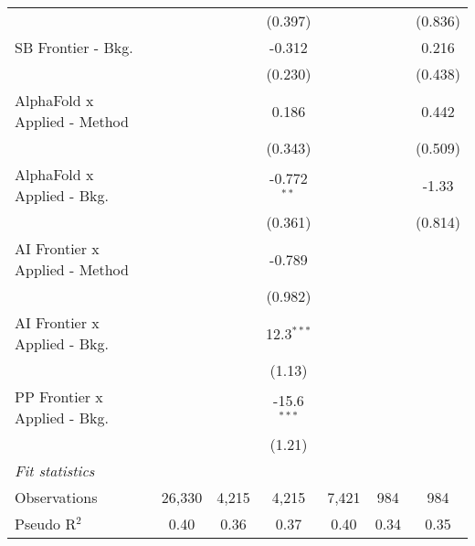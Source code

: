 \begin{tabular}{lcccccc}
                                  &               &               & (0.397)       &              &         & (0.836)\\   
   SB Frontier - Bkg.             &               &               & -0.312        &              &         & 0.216\\   
                                  &               &               & (0.230)       &              &         & (0.438)\\   
   AlphaFold x Applied - Method   &               &               & 0.186         &              &         & 0.442\\   
                                  &               &               & (0.343)       &              &         & (0.509)\\   
   AlphaFold x Applied - Bkg.     &               &               & -0.772$^{**}$ &              &         & -1.33\\   
                                  &               &               & (0.361)       &              &         & (0.814)\\   
   AI Frontier x Applied - Method &               &               & -0.789        &              &         &   \\   
                                  &               &               & (0.982)       &              &         &   \\   
   AI Frontier x Applied - Bkg.   &               &               & 12.3$^{***}$  &              &         &   \\   
                                  &               &               & (1.13)        &              &         &   \\   
   PP Frontier x Applied - Bkg.   &               &               & -15.6$^{***}$ &              &         &   \\   
                                  &               &               & (1.21)        &              &         &   \\   
   \midrule
   \emph{Fit statistics}\\
   Observations                   & 26,330        & 4,215         & 4,215         & 7,421        & 984     & 984\\  
   Pseudo R$^2$                   & 0.40          & 0.36          & 0.37          & 0.40         & 0.34    & 0.35\\  
   

\end{tabular}
